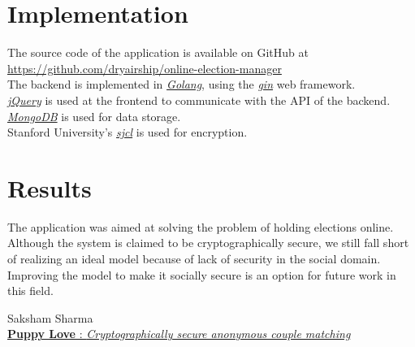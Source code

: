 \documentclass[twoside,twocolumn]{article}
\newcommand\tab[1][1cm]{\hspace*{#1}}
\begin{document}
\section{Implementation}
    \tab The source code of the application is available on GitHub at \href{https://github.com/dryairship/online-election-manager}{https://github.com/dryairship/online-election-manager}\\
    \tab The backend is implemented in \href{https://golang.org/}{\textit{Golang}}, using the \href{https://github.com/gin-gonic/gin}{\textit{gin}} web framework.\\
    \tab \href{https://jquery.com/}{\textit{jQuery}} is used at the frontend to communicate with the API of the backend.\\
    \tab \href{https://www.mongodb.com/}{\textit{MongoDB}} is used for data storage.\\
    \tab Stanford University's \href{https://github.com/bitwiseshiftleft/sjcl}{\textit{sjcl}} is used for encryption.\\

\section{Results}
\tab The application was aimed at solving the problem of holding elections online. Although the system is claimed to be cryptographically secure, we still fall short of realizing an ideal model because of lack of security in the social domain. Improving the model to make it socially secure is an option for future work in this field.
\begin{thebibliography}{99}
Saksham Sharma\\
\newblock \href{https://github.com/pclubiitk/puppy-love/raw/master/frontend/src/assets/report.pdf}{\textbf{Puppy Love} : \textit{Cryptographically secure anonymous couple matching}}
\end{thebibliography}
\end{document}
